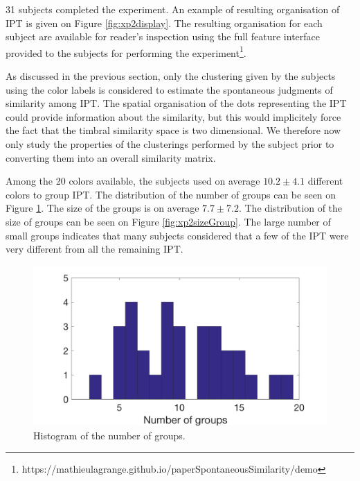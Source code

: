 \documentclass{article}
\newcommand{\ipt}{IPT\xspace}
\begin{document}
31 subjects completed the experiment. An example of resulting organisation of \ipt is given on Figure \ref{fig:xp2display}. The resulting organisation for each subject are available for reader's inspection using the full feature interface provided to the subjects for performing the experiment\footnote{https://mathieulagrange.github.io/paperSpontaneousSimilarity/demo}.

As discussed in the previous section, only the clustering given by the subjects using the color labels is considered to estimate the spontaneous judgments of similarity among \ipt. The spatial organisation of the dots representing the \ipt could provide information about the similarity, but this would implicitely force the fact that the timbral similarity space is two dimensional. We therefore now only study the properties of the clusterings performed by the subject prior to converting them into an overall similarity matrix.

Among the 20 colors available, the subjects used on average $10.2 \pm  4.1$ different colors to group \ipt. The distribution of the number of groups can be seen on Figure \ref{fig:xp2nbGroup}. The size of the groups is on average $7.7 \pm   7.2$. The distribution of the size of groups can be seen on Figure \ref{fig:xp2sizeGroup}. The large number of small groups indicates that many subjects considered that a few of the \ipt were very different from all the remaining \ipt.

\begin{figure}
\center
\includegraphics[width = \textwidth]{figures/nbc.png}
\caption{Histogram of the number of groups.}
\label{fig:xp2nbGroup}
\end{figure}
\end{document}
